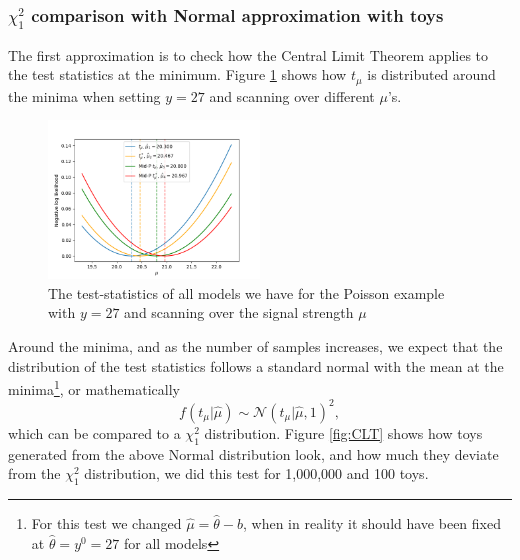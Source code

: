 \documentclass[14pt, a4paper]{article}  %
\begin{document}
\subsubsection{$\chi^2_1$ comparison with Normal approximation with toys}
The first approximation is to check how the Central Limit Theorem applies to the test statistics at the minimum. Figure \ref{fig:nlls} shows how $t_\mu$ is distributed around the minima when setting $y=27$ and scanning over different $\mu$'s. 
\begin{figure}[!ht]
	\centering
        \includegraphics[width=0.5\textwidth]{Book_examples/nll_book.png}
	\caption{The test-statistics of all models we have for the Poisson example with $y=27$ and scanning over the signal strength $\mu$}\label{fig:nlls}
\end{figure} 
Around the minima, and as the number of samples increases, we expect that the distribution of the test statistics follows a standard normal with the mean at the minima\footnote{For this test we changed $\hat\mu=\hat\theta-b$, when in reality it should have been fixed at $\hat{\theta} = y^0=27$ for all models}, or mathematically
$$
f(t_\mu|\hat{\mu}) \sim\mathcal{N}(t_\mu|\hat{\mu}, 1)^2,
$$
which can be compared to a $\chi^2_1$ distribution. Figure \ref{fig:CLT} shows how toys generated from the above Normal distribution look, and how much they deviate from the $\chi^2_1$ distribution, we did this test for 1,000,000 and 100 toys.
\end{document}

